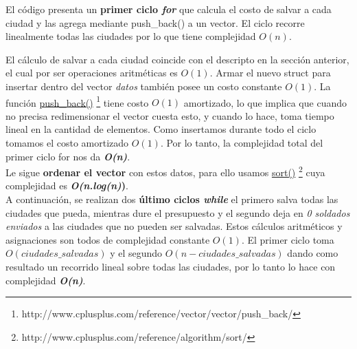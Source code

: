 
El c\'odigo presenta un \textbf{primer ciclo \emph{for}} que calcula el costo de salvar a cada ciudad y las agrega mediante push_back() a un vector. El ciclo recorre linealmente todas las ciudades por lo que tiene complejidad $O(n)$. 

El c\'alculo de salvar a cada ciudad coincide con el descripto en la secci\'on anterior, el cual por ser operaciones aritm\'eticas es $O(1)$. Armar el nuevo struct para insertar dentro del vector \emph{datos} tambi\'en posee un costo constante $O(1)$. La funci\'on \href{http://www.cplusplus.com/reference/vector/vector/push_back/}{push\_back()} \footnote{http://www.cplusplus.com/reference/vector/vector/push_back/} tiene costo $O(1)$ amortizado, lo que implica que cuando no precisa redimensionar el vector cuesta esto, y cuando lo hace, toma tiempo lineal en la cantidad de elementos. Como insertamos durante todo el ciclo tomamos el costo amortizado $O(1)$.
Por lo tanto, la complejidad total del primer ciclo for nos da \textbf{\textit{O(n)}}.\\

Le sigue \textbf{ordenar el vector} con estos datos, para ello usamos \href{http://www.cplusplus.com/reference/algorithm/sort/}{sort()} \footnote{http://www.cplusplus.com/reference/algorithm/sort/} cuya complejidad es \textbf{\textit{O(n.log(n)})}.\\

A continuaci\'on, se realizan dos \textbf{\'ultimo ciclos \emph{while}} el primero salva todas las ciudades que pueda, mientras dure el presupuesto y el segundo deja en \emph{0 soldados enviados} a las ciudades que no pueden ser salvadas. Estos c\'alculos aritm\'eticos y asignaciones son todos de complejidad constante $O(1)$. El primer ciclo toma $O(ciudades\_salvadas)$ y el segundo $O(n-ciudades\_salvadas)$ dando como resultado un recorrido lineal sobre todas las ciudades, por lo tanto lo hace con complejidad \textbf{\textit{O(n)}}.\\



